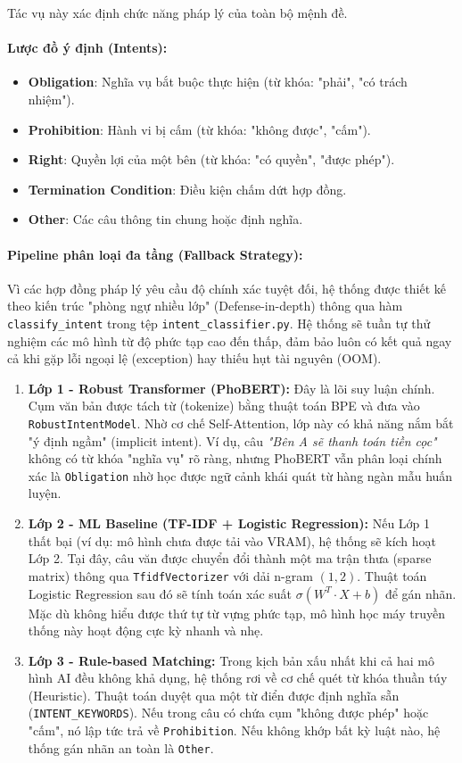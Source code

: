 Tác vụ này xác định chức năng pháp lý của toàn bộ mệnh đề.

\paragraph{Lược đồ ý định (Intents):}
\begin{itemize}
    \item \textbf{Obligation}: Nghĩa vụ bắt buộc thực hiện (từ khóa: "phải", "có trách nhiệm").
    \item \textbf{Prohibition}: Hành vi bị cấm (từ khóa: "không được", "cấm").
    \item \textbf{Right}: Quyền lợi của một bên (từ khóa: "có quyền", "được phép").
    \item \textbf{Termination Condition}: Điều kiện chấm dứt hợp đồng.
    \item \textbf{Other}: Các câu thông tin chung hoặc định nghĩa.
\end{itemize}

\paragraph{Pipeline phân loại đa tầng (Fallback Strategy):}
Vì các hợp đồng pháp lý yêu cầu độ chính xác tuyệt đối, hệ thống được thiết kế theo kiến trúc "phòng ngự nhiều lớp" (Defense-in-depth) thông qua hàm \texttt{classify\_intent} trong tệp \texttt{intent\_classifier.py}. Hệ thống sẽ tuần tự thử nghiệm các mô hình từ độ phức tạp cao đến thấp, đảm bảo luôn có kết quả ngay cả khi gặp lỗi ngoại lệ (exception) hay thiếu hụt tài nguyên (OOM).

\begin{enumerate}
    \item \textbf{Lớp 1 - Robust Transformer (PhoBERT):} Đây là lõi suy luận chính. Cụm văn bản được tách từ (tokenize) bằng thuật toán BPE và đưa vào \texttt{RobustIntentModel}. Nhờ cơ chế Self-Attention, lớp này có khả năng nắm bắt "ý định ngầm" (implicit intent). Ví dụ, câu \textit{"Bên A sẽ thanh toán tiền cọc"} không có từ khóa "nghĩa vụ" rõ ràng, nhưng PhoBERT vẫn phân loại chính xác là \texttt{Obligation} nhờ học được ngữ cảnh khái quát từ hàng ngàn mẫu huấn luyện.
    \item \textbf{Lớp 2 - ML Baseline (TF-IDF + Logistic Regression):} Nếu Lớp 1 thất bại (ví dụ: mô hình chưa được tải vào VRAM), hệ thống sẽ kích hoạt Lớp 2. Tại đây, câu văn được chuyển đổi thành một ma trận thưa (sparse matrix) thông qua \texttt{TfidfVectorizer} với dải n-gram $(1, 2)$. Thuật toán Logistic Regression sau đó sẽ tính toán xác suất $\sigma(W^T \cdot X + b)$ để gán nhãn. Mặc dù không hiểu được thứ tự từ vựng phức tạp, mô hình học máy truyền thống này hoạt động cực kỳ nhanh và nhẹ.
    \item \textbf{Lớp 3 - Rule-based Matching:} Trong kịch bản xấu nhất khi cả hai mô hình AI đều không khả dụng, hệ thống rơi về cơ chế quét từ khóa thuần túy (Heuristic). Thuật toán duyệt qua một từ điển được định nghĩa sẵn (\texttt{INTENT\_KEYWORDS}). Nếu trong câu có chứa cụm "không được phép" hoặc "cấm", nó lập tức trả về \texttt{Prohibition}. Nếu không khớp bất kỳ luật nào, hệ thống gán nhãn an toàn là \texttt{Other}.
\end{enumerate}

